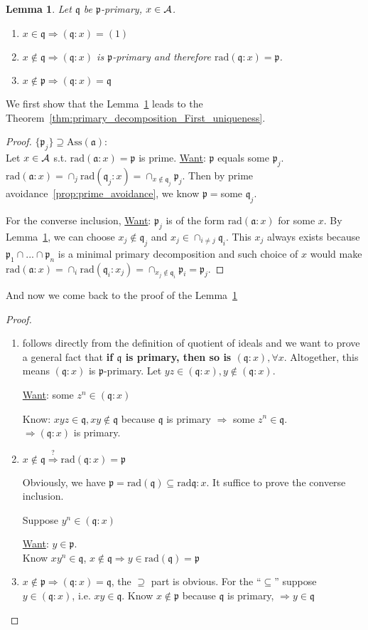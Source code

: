 \documentclass[11pt]{article}
\newtheorem{lemma}[thm]{Lemma}
\newcommand{\sca}{{\mathfrak a}}
\newcommand{\scp}{{\mathfrak p}}
\newcommand{\scq}{\mathfrak q}
\newcommand{\cala}{{\cal A}}
\newcommand{\Lrta}{\Longrightarrow}
\begin{document}
\begin{lemma}\label{lem:p-primary_ideal}
Let $\scq$ be $\scp$-primary, $x\in\cala$.
\begin{enumerate}[label=(\alph*)]
 \item
 $x\in\scq\Lrta(\scq:x)=(1)$
\item 
 $x\notin\scq\Lrta (\scq:x)$ is $\scp$-primary and therefore $\text{rad}(\scq:x)=\scp$.
\item 
 $x\notin\scp\Lrta (\scq:x)=\scq$
\end{enumerate}
\end{lemma}

We first show that the Lemma~\ref{lem:p-primary_ideal} leads to the Theorem~\ref{thm:primary_decomposition_First_uniqueness}.
\begin{proof}
$\{\scp_j\}\supseteq \text{Ass}(  \sca)$:\\
 Let $x\in\cala$ s.t. $\text{rad}(\sca:x)=\scp$ is prime. \underline{Want}: $\scp$ equals some $\scp_j$. $\text{rad}(\sca:x)=\cap_j \text{rad}(\scq_j:x)=\cap_{x\notin\scq_j}\scp_j$. Then by prime avoidance~\ref{prop:prime_avoidance}, we know $\scp=$some $\scq_j$.

For the converse inclusion, \underline{Want}: $\scp_j$ is of the form $\text{rad}(\sca:x)$ for some $x$. By Lemma~\ref{lem:p-primary_ideal}, we can choose $x_j\notin \scq_j$ and $x_j\in\cap_{i\neq j}\scq_i$. This $x_j$ always exists because $\scp_1\cap...\cap \scp_n$ is a minimal primary decomposition and such choice of $x$ would make $\text{rad}(\sca:x)=\cap_i \text{rad}(\scq_i:x_j)=\cap_{x_j\notin\scq_i}\scp_i=\scp_j$.
\end{proof}

And now we come back to the proof of the Lemma~\ref{lem:p-primary_ideal}
\begin{proof}\ 
\begin{enumerate}[label=(\alph*)]
\item follows directly from the definition of quotient of ideals and we want to prove a general fact that \textbf{ if $\scq$ is primary, then so is $(\scq:x),\forall x$}. Altogether, this means $(\scq:x)$ is $\scp$-primary.
Let $y z\in(\scq:x),y\notin (\scq:x)$. 

\underline{Want}: some $z^n\in(\scq:x)$

Know: $xyz\in\scq,xy\notin\scq$ because $\scq$ is primary $\Lrta$ some $z^n\in\scq$.\\
$\Lrta(\scq:x)$ is primary.
\item  
$x\notin\scq\overset{?}{\Lrta}\text{rad}(\scq:x)=\scp$

Obviously, we have $\scp=\text{rad}(\scq)\subseteq\text{rad}{\scq:x}$. It suffice to prove the converse inclusion.

Suppose $y^n\in(\scq:x)$

\underline{Want}: $y\in\scp.$\\
Know $xy^n\in\scq$, $x\notin\scq\Lrta y\in \text{rad}(\scq)=\scp$
\item 
$x\notin \scp\Lrta (\scq:x)=\scq$, the $\supseteq$ part is obvious. For the ``$\subseteq$'' suppose $y\in(\scq:x)$, i.e. $xy\in\scq$. Know $x\notin\scp$ because $\scq$ is primary, $\Lrta y\in\scq$
\end{enumerate}
\end{proof}
\end{document}
